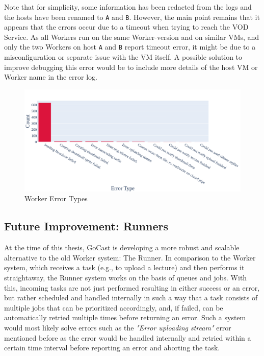 Note that for simplicity, some information has been redacted from the logs and the hosts have been renamed to \texttt{A} and \texttt{B}. However, the main point remains that it appears that the errors occur due to a timeout when trying to reach the VOD Service. As all Workers run on the same Worker-version and on similar \ac{VM}s, and only the two Workers on host \texttt{A} and \texttt{B} report timeout error, it might be due to a misconfiguration or separate issue with the \ac{VM} itself. A possible solution to improve debugging this error would be to include more details of the host \ac{VM} or Worker name in the error log. 

\begin{figure}[htpb]
    \centering
    \includegraphics[width=\linewidth]{images/plots/worker/error_types.png}
    \caption[Worker Error Types]{Worker Error Types}\label{fig:worker-error-types}
\end{figure}

\subsection{Future Improvement: Runners}\label{subsection:runner}

At the time of this thesis, GoCast is developing a more robust and scalable alternative to the old Worker system: The Runner. In comparison to the Worker system, which receives a task (e.g., to upload a lecture) and then performs it straightaway, the Runner system works on the basis of queues and jobs. With this, incoming tasks are not just performed resulting in either success or an error, but rather scheduled and handled internally in such a way that a task consists of multiple jobs that can be prioritized accordingly, and, if failed, can be automatically retried multiple times before returning an error. Such a system would most likely solve errors such as the \textit{"Error uploading stream"} error mentioned before as the error would be handled internally and retried within a certain time interval before reporting an error and aborting the task.


